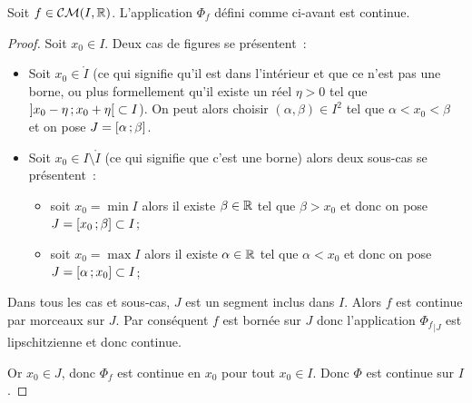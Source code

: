 \begin{prop}
  Soit \(f \in \mathcal{CM}(I,\mathbb{R})\). L'application \(\Phi_f\) défini comme ci-avant est
  continue.
\end{prop}
\begin{proof}
  Soit \(x_0 \in I\). Deux cas de figures se présentent~:
  \begin{itemize}
    \item Soit \(x_0 \in \mathring{I}\) (ce qui signifie qu'il est dans
      l'intérieur et que ce n'est pas une borne, ou plus formellement qu'il
      existe un réel \(\eta>0\) tel que \(\left] x_0-\eta \, ; {} x_0+\eta \right[
      \subset I\)). On peut alors choisir \((\alpha,\beta) \in I^2\) tel que
      \(\alpha < x_0 < \beta\) et on pose \(J = \left[ \alpha \, ; {} \beta \right]\).
    \item Soit \(x_0 \in I\setminus\mathring{I}\) (ce qui signifie que c'est une
      borne) alors deux sous-cas se présentent~:
      \begin{itemize}
        \item soit \(x_0 = \min I\) alors il existe \(\beta \in \mathbb{R}\) tel que
          \(\beta > x_0\) et donc on pose \(J = \left[ x_0 \, ; {} \beta \right] \subset
          I\);
        \item soit \(x_0 = \max I\) alors il existe \(\alpha \in \mathbb{R}\) tel que
          \(\alpha < x_0\) et donc on pose \(J = \left[ \alpha \, ; {} x_0 \right]
          \subset I\);
      \end{itemize}
  \end{itemize}

  Dans tous les cas et sous-cas, \(J\) est un segment inclus dans \(I\). Alors
  \(f\) est continue par morceaux sur \(J\). Par conséquent \(f\) est bornée sur
  \(J\) donc l'application \({\Phi_f}_{|J}\) est lipschitzienne et donc
  continue.

  Or \(x_0 \in J\), donc \(\Phi_f\) est continue en \(x_0\) pour tout \(x_0 \in
  I\). Donc \(\Phi\) est continue sur \(I\).
\end{proof}

